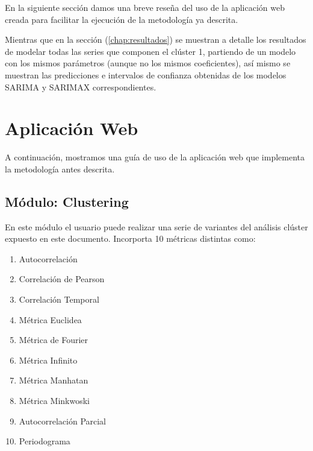 \documentclass[12pt,oneside]{book}\usepackage[]{graphicx}\usepackage[]{color}
\theoremstyle{definition} %
\begin{document}
En la siguiente sección damos una breve reseña del uso de la aplicación web creada para facilitar la ejecución de la metodología ya descrita.

Mientras que en la sección (\autoref{chap:resultados}) se muestran a detalle los resultados de modelar todas las series que componen el clúster 1, partiendo de un modelo con los mismos parámetros (aunque no los mismos coeficientes), así mismo se muestran las predicciones e intervalos de confianza obtenidas de los modelos SARIMA y SARIMAX correspondientes.




















\chapter{Aplicación Web}
\label{chp:webapp}

A continuación, mostramos una guía de uso de la aplicación web que implementa la metodología antes descrita.


\section{Módulo: Clustering}

En este módulo el usuario puede realizar una serie de variantes del análisis clúster expuesto en este documento. Incorporta 10 métricas distintas como:

\begin{enumerate}
\item Autocorrelación
\item Correlación de Pearson
\item Correlación Temporal
\item Métrica Euclidea
\item Métrica de Fourier
\item Métrica Infinito
\item Métrica Manhatan
\item Métrica Minkwoski
\item Autocorrelación Parcial
\item Periodograma
\end{enumerate}
\end{document}
